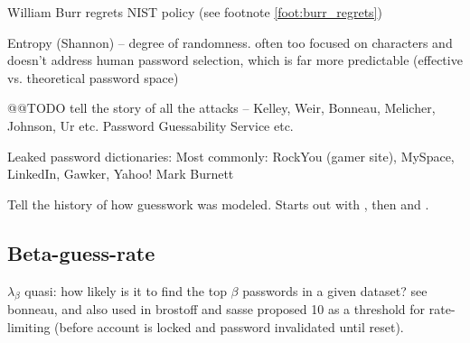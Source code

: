 	
	William Burr regrets NIST policy (see footnote \ref{foot:burr_regrets})	
	
	Entropy (Shannon) -- degree of randomness. often too focused on characters and doesn't address human password selection, which is far more predictable 
	(effective vs. theoretical password space)
	
	@@TODO tell the story of all the attacks -- Kelley, Weir, Bonneau, Melicher, Johnson, Ur etc. Password Guessability Service etc. 
	
	Leaked password dictionaries: Most commonly: RockYou (gamer site), MySpace, LinkedIn, Gawker, Yahoo!
	Mark Burnett  \cite{Burnett2005PerfectPasswords} 
	
	Tell the history of how guesswork was modeled. Starts out with \cite{Weir2010MetricsPolicies}, then \cite{Kelley20012GuessAgain} and \cite{Bonneau2012ScienceOfGuessing}. 
	
	\subsection{Beta-guess-rate}
	$\lambda_{\beta}$
	quasi: how likely is it to find the top $\beta$ passwords in a given dataset?
	see bonneau, and also used in \cite{Yang2016MnemonicSentenceBased}
	brostoff and sasse  proposed 10 as a threshold for rate-limiting (before account is locked and password invalidated until reset).
	
	
	
	
